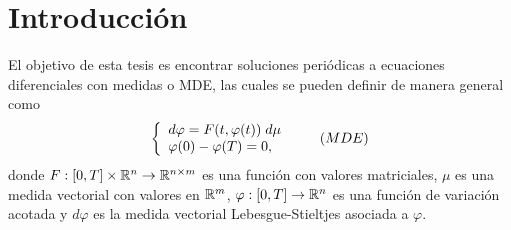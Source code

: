 

\chapter{Introducción}
El objetivo de esta tesis es encontrar soluciones periódicas a ecuaciones diferenciales con medidas o MDE, las cuales se pueden definir de manera general como 
	\begin{equation*}
	\left\lbrace \begin{array}{l} \label{eq:problema A}
		d\varphi=F(t,\varphi(t))\;d \mu\\
		\varphi(0)-\varphi(T)=0,
	\end{array}\right. \tag{${MDE}$}
\end{equation*}
donde $F:[0,T]\times\mathbb{R}^n\to\mathbb{R}^{n\times m}$ es una función con valores matriciales, $\mu$ es una medida vectorial con valores en $\mathbb{R}^m$, $\varphi:[0,T]\to \mathbb{R}^n$ es una función de variación acotada  y $d\varphi$ es la medida vectorial Lebesgue-Stieltjes asociada a $\varphi$.

